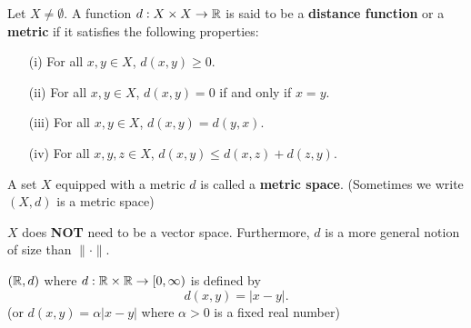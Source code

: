 \documentclass[a4paper]{report}
\begin{document}
\begin{definition}
Let \(  X \neq \emptyset  \). A function \( d: X \times X \to \mathbb{R}  \) is said to be a \textbf{distance function} or a \textbf{metric} if it satisfies the following properties:
\begin{enumerate}
    \item[(i)] For all \( x,y \in X  \), \( d(x,y) \geq 0  \).
    \item[(ii)] For all \( x,y \in X  \), \( d(x,y) = 0  \) if and only if \( x = y  \).
    \item[(iii)] For all \( x,y \in X  \), \( d(x,y) = d(y,x) \).
    \item[(iv)] For all \( x,y,z \in X  \), \( d(x,y) \leq d(x,z) + d(z,y) \).
\end{enumerate}
A set \( X  \) equipped with a metric \( d  \) is called a \textbf{metric space}. (Sometimes we write \( (X,d)  \) is a metric space)
\end{definition}
\begin{remark}
    \( X  \) does \textbf{NOT} need to be a vector space. Furthermore, \( d  \) is a more general notion of size than \( \| \cdot \| \).
\end{remark}


\begin{eg}
    \( (\mathbb{R} , d)  \) where \( d: \mathbb{R} \times \mathbb{R} \to [0,\infty)   \) is defined by 
    \[  d(x,y) = |  x - y  |. \]
    (or \( d(x,y) = \alpha |  x - y  |  \) where \( \alpha > 0  \) is a fixed real number)


\end{eg}
\end{document}
